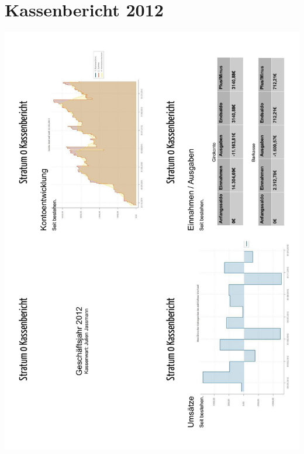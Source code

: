 \documentclass[a4paper,12pt]{scrartcl}
\begin{document}
\section{Kassenbericht 2012}\label{sec:kassenbericht}
\enlargethispage{4\baselineskip}
\includegraphics[height=\textheight]{images/Kassenbericht_2012_1.pdf}
\newpage
\end{document}

